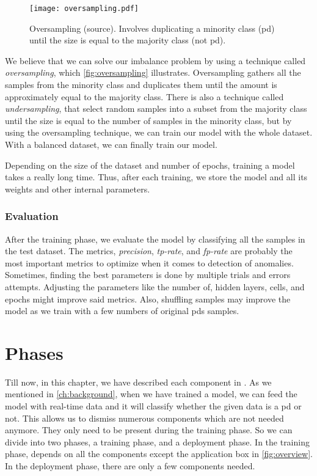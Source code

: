 \begin{figure}[ht]
    \centering
    \texttt{[image: oversampling.pdf]}
    \caption[Oversampling dataset]{Oversampling (source\cite{tw_imbalance}). Involves duplicating a minority class (\ac{pd}) until the size is equal to the majority class (not \ac{pd}).}
    \label{fig:oversampling}
\end{figure}

We believe that we can solve our imbalance problem by using a technique called \emph{oversampling}, which \autoref{fig:oversampling} illustrates. Oversampling gathers all the samples from the minority class and duplicates them until the amount is approximately equal to the majority class. There is also a technique called \emph{undersampling}, that select random samples into a subset from the majority class until the size is equal to the number of samples in the minority class, but by using the oversampling technique, we can train our model with the whole dataset. With a balanced dataset, we can finally train our model.

Depending on the size of the dataset and number of epochs, training a model takes a really long time. Thus, after each training, we store the model and all its weights and other internal parameters.

\subsubsection{Evaluation}
After the training phase, we evaluate the model by classifying all the samples in the test dataset. The metrics, \emph{precision}, \emph{tp-rate}, and \emph{fp-rate} are probably the most important metrics to optimize when it comes to detection of anomalies. Sometimes, finding the best parameters is done by multiple trials and errors attempts. Adjusting the parameters like the number of, hidden layers, cells, and epochs might improve said metrics. Also, shuffling samples may improve the model as we train with a few numbers of original \acp{pd} samples.
\fi

\section{Phases}
Till now, in this chapter, we have described each component in \project. As we mentioned in \autoref{ch:background}, when we have trained a model, we can feed the model with real-time data and it will classify whether the given data is a \ac{pd} or not. This allows us to dismiss numerous components which are not needed anymore. They only need to be present during the training phase. So we can divide \project into two phases, a training phase, and a deployment phase. In the training phase, \project depends on all the components except the application box in \autoref{fig:overview}. In the deployment phase, there are only a few components needed.


